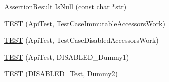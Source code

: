 \begin{DoxyCompactItemize}
\item 
\hyperlink{classtesting_1_1AssertionResult}{\-Assertion\-Result} \hyperlink{namespacetesting_1_1internal_adcfd37a66bc4cb0e8291cf46e1a6c72b}{\-Is\-Null} (const char $\ast$str)
\item 
\hyperlink{namespacetesting_1_1internal_a33809333fe5b5f33c2bd56ddcdd1dbb6}{\-T\-E\-S\-T} (\-Api\-Test, \-Test\-Case\-Immutable\-Accessors\-Work)
\item 
\hyperlink{namespacetesting_1_1internal_a459d693357db8f8f48c26a8bee3ffb84}{\-T\-E\-S\-T} (\-Api\-Test, \-Test\-Case\-Disabled\-Accessors\-Work)
\item 
\hyperlink{namespacetesting_1_1internal_a9ed5f89c92532506899e3908e79af4de}{\-T\-E\-S\-T} (\-Api\-Test, \-D\-I\-S\-A\-B\-L\-E\-D\-\_\-\-Dummy1)
\item 
\hyperlink{namespacetesting_1_1internal_a4a84433419426d1c1b87ce998267b0d4}{\-T\-E\-S\-T} (\-D\-I\-S\-A\-B\-L\-E\-D\-\_\-\-Test, \-Dummy2)
\end{DoxyCompactItemize}
